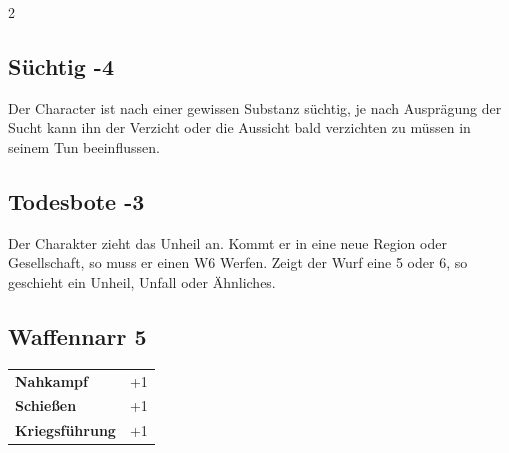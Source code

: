 \begin{multicols}{2}
\begin{tcolorbox}
\vspace{3mm}



\end{tcolorbox}

\begin{tcolorbox}
    \subsection*{Süchtig \hfill \small{-4 }}
    \tcblower
Der Character ist nach einer gewissen Substanz süchtig, je nach Ausprägung der Sucht kann ihn der Verzicht oder die Aussicht bald verzichten zu müssen in seinem Tun beeinflussen.


\vspace{3mm}



\end{tcolorbox}

\begin{tcolorbox}
    \subsection*{Todesbote \hfill \small{-3 }}
    \tcblower
Der Charakter zieht das Unheil an. Kommt er in eine neue Region oder Gesellschaft, so muss er einen W6 Werfen. Zeigt der Wurf eine 5 oder 6, so geschieht ein Unheil, Unfall oder Ähnliches.


\vspace{3mm}



\end{tcolorbox}

\begin{tcolorbox}
    \subsection*{Waffennarr \hfill \small{5 }}
    \tcblower




\begin{tabular}{@{}ll@{}}
    \textbf{Nahkampf} & +1\\
    \textbf{Schießen} & +1\\
    \textbf{Kriegsführung} & +1\\
\end{tabular}


\end{tcolorbox}
\end{multicols}
